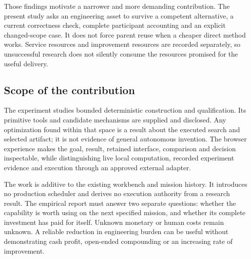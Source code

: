 Those findings motivate a narrower and more demanding contribution. The present study asks an engineering asset to survive a competent alternative, a current correctness check, complete participant accounting and an explicit changed-scope case. It does not force parent reuse when a cheaper direct method works. Service resources and improvement resources are recorded separately, so unsuccessful research does not silently consume the resources promised for the useful delivery.

\subsection{Scope of the contribution}

The experiment studies bounded deterministic construction and qualification. Its primitive tools and candidate mechanisms are supplied and disclosed. Any optimization found within that space is a result about the executed search and selected artifact; it is not evidence of general autonomous invention. The browser experience makes the goal, result, retained interface, comparison and decision inspectable, while distinguishing live local computation, recorded experiment evidence and execution through an approved external adapter.

The work is additive to the existing workbench and mission history. It introduces no production scheduler and derives no execution authority from a research result. The empirical report must answer two separate questions: whether the capability is worth using on the next specified mission, and whether its complete investment has paid for itself. Unknown monetary or human costs remain unknown. A reliable reduction in engineering burden can be useful without demonstrating cash profit, open-ended compounding or an increasing rate of improvement.
